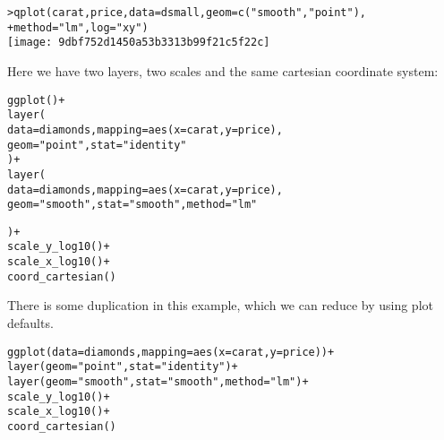 \begin{alltt}
> qplot(carat, price, data = dsmall, geom = c("smooth", "point"), 
+     method = "lm", log = "xy")
\texttt{[image: 9dbf752d1450a53b3313b99f21c5f22c]}

\end{alltt}

Here we have two layers, two scales and the same cartesian coordinate system:

\begin{alltt}
ggplot() + 
layer(
  data = diamonds, mapping = aes(x = carat, y = price),
  geom = "point", stat = "identity"
) + 
layer(
  data = diamonds, mapping = aes(x = carat, y = price),
  geom = "smooth", stat = "smooth", method = "lm"
  
) + 
scale_y_log10() + 
scale_x_log10() + 
coord_cartesian()
\end{alltt}

There is some duplication in this example, which we can reduce by using plot defaults.

\begin{alltt}
ggplot(data = diamonds, mapping = aes(x = carat, y = price)) + 
layer(geom = "point", stat = "identity") + 
layer(geom = "smooth", stat = "smooth", method = "lm") + 
scale_y_log10() + 
scale_x_log10() + 
coord_cartesian()
\end{alltt}


% 
% 
% 
% 
% 
% 
% 
% 
% 


